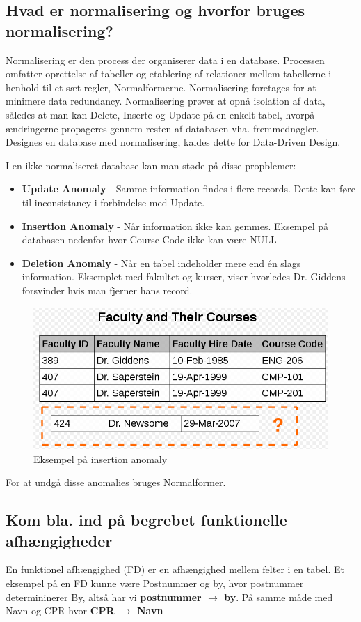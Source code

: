 \newpage

\subsection{Hvad er normalisering og hvorfor bruges normalisering?}\label{sec:normal}
Normalisering er den process der organiserer data i en database. Processen omfatter oprettelse af tabeller og etablering af relationer mellem tabellerne i henhold til et sæt regler, Normalformerne. Normalisering foretages for at minimere data redundancy. Normalisering prøver at opnå isolation af data, således at man kan Delete, Inserte og Update på en enkelt tabel, hvorpå ændringerne propageres gennem resten af databasen vha. fremmednøgler. Designes en database med normalisering, kaldes dette for Data-Driven Design.

I en ikke normaliseret database kan man støde på disse propblemer:

\begin{itemize}
	\item \textbf{Update Anomaly} - Samme information findes i flere records. Dette kan føre til inconsistancy i forbindelse med Update.
	\item \textbf{Insertion Anomaly} - Når information ikke kan gemmes. Eksempel på databasen nedenfor hvor Course Code ikke kan være NULL
	\item \textbf{Deletion Anomaly} - Når en tabel indeholder mere end én slags information. Eksemplet med fakultet og kurser, viser hvorledes Dr. Giddens forsvinder hvis man fjerner hans record.	
\end{itemize}

\begin{figure}[H]
	\centering
	\includegraphics[width=0.7\linewidth]{figs/spm5/insertionAnomaly.PNG}
	\caption{Eksempel på insertion anomaly}
	\label{fig:insertionAnomaly}
\end{figure}

For at undgå disse anomalies bruges Normalformer.

\subsection{Kom bla. ind på begrebet funktionelle afhængigheder}
En funktionel afhængighed (FD) er en afhængighed mellem felter i en tabel.
Et eksempel på en FD kunne være Postnummer og by, hvor postnummer determininerer By, altså har vi \textbf{postnummer $\rightarrow$ by}. På samme måde med Navn og CPR hvor \textbf{CPR $\rightarrow$ Navn}

